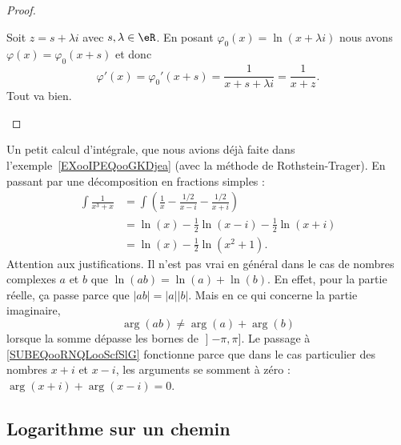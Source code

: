 \begin{proof}
\begin{subproof}

		Soit \( z=s+\lambda i\) avec \( s,\lambda\in \eR\). En posant \( \varphi_0(x)=\ln(x+\lambda i)\) nous avons \( \varphi(x)=\varphi_0(x+s)\) et donc
		\begin{equation}
			\varphi'(x)=\varphi_0'(x+s)=\frac{ 1 }{ x+s+\lambda i }=\frac{1}{ x+z }.
		\end{equation}
		Tout va bien.

	\end{subproof}
\end{proof}

\begin{example}     \label{EXooAKEDooZgjocX}
	Un petit calcul d'intégrale, que nous avions déjà faite dans l'exemple~\ref{EXooIPEQooGKDjea} (avec la méthode de Rothstein-Trager). En passant par une décomposition en fractions simples :
	\begin{subequations}
		\begin{align}
			\int\frac{1}{ x^3+x } & =\int\left( \frac{1}{ x }-\frac{ 1/2 }{ x-i }-\frac{ 1/2 }{ x+i } \right) \\
			                      & =\ln(x)-\frac{ 1 }{2}\ln(x-i)-\frac{ 1 }{2}\ln(x+i)                       \\
			                      & =\ln(x)-\frac{ 1 }{2}\ln(x^2+1).       \label{SUBEQooRNQLooScfSlG}
		\end{align}
	\end{subequations}
	Attention aux justifications. Il n'est pas vrai en général dans le cas de nombres complexes \( a\) et \( b\) que \( \ln(ab)=\ln(a)+\ln(b)\). En effet, pour la partie réelle, ça passe parce que \( | ab |=| a | |b |\). Mais en ce qui concerne la partie imaginaire,
	\begin{equation}
		\arg(ab)\neq \arg(a)+\arg(b)
	\end{equation}
	lorsque la somme dépasse les bornes de \( \mathopen] -\pi , \pi \mathclose]\). Le passage à \eqref{SUBEQooRNQLooScfSlG} fonctionne parce que dans le cas particulier des nombres \( x+i\) et \( x-i\), les arguments se somment à zéro : \( \arg(x+i)+\arg(x-i)=0\).
\end{example}

\subsection{Logarithme sur un chemin}

